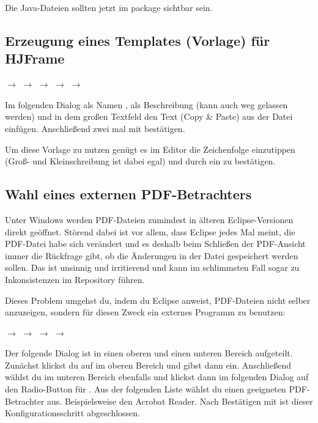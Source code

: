 Die Java-Dateien sollten jetzt im package  sichtbar sein.

\subsection{Erzeugung eines Templates (Vorlage) für HJFrame}

 $\rightarrow$  $\rightarrow$ 
$\rightarrow$  $\rightarrow$  $\rightarrow$

Im folgenden Dialog als Namen , als Beschreibung (kann
auch weg gelassen werden)  und in dem großen Textfeld  den
Text (Copy \& Paste) aus der Datei  einfügen.
Anschließend zwei mal mit  bestätigen.

Um diese Vorlage zu nutzen genügt es im Editor die Zeichenfolge
 einzutippen (Groß- und Kleinschreibung ist dabei egal) und
durch ein  zu bestätigen.


\subsection{Wahl eines externen PDF-Betrachters}

Unter Windows werden PDF-Dateien zumindest in älteren Eclipse-Versionen direkt
geöffnet. Störend dabei ist vor allem, dass Eclipse jedes Mal meint, die
PDF-Datei habe sich verändert und es deshalb beim Schließen der PDF-Ansicht
immer die Rückfrage gibt, ob die Änderungen in der Datei gespeichert werden
sollen. Das ist unsinnig und irritierend und kann im schlimmsten Fall sogar zu
Inkonsistenzen im Repository führen.

Dieses Problem umgehst du, indem du Eclipse anweist, PDF-Dateien nicht selber
anzuzeigen, sondern für diesen Zweck ein externes Programm zu benutzen:

 $\rightarrow$  $\rightarrow$ 
$\rightarrow$  $\rightarrow$ 

Der folgende Dialog ist in einen oberen und einen unteren Bereich aufgeteilt.
Zunächst klickst du auf  im oberen Bereich und gibst dann
 ein. Anschließend wählst du im unteren Bereich ebenfalls
 und klickst dann im folgenden Dialog auf den Radio-Button für
. Aus der folgenden Liste wählst du einen geeigneten
PDF-Betrachter aus. Beispielsweise den Acrobat Reader. Nach Bestätigen mit
 ist dieser Konfigurationsschritt abgeschlossen.

